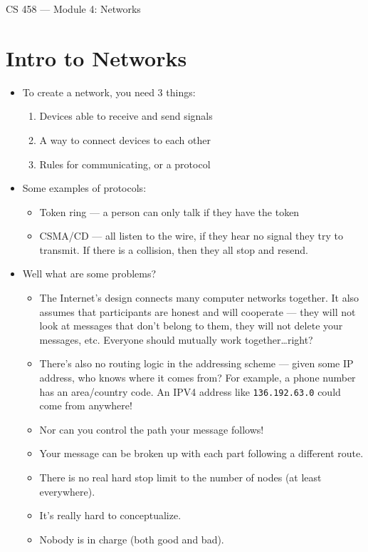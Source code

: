 \documentclass{article}
\author{Clement Tsang}
\begin{document}
\begin{center}
    \Large{CS 458 --- Module 4: Networks}
\end{center}

\section{Intro to Networks}
\begin{itemize}
    \item To create a network, you need 3 things:
        \begin{enumerate}
            \item Devices able to receive and send signals
            \item A way to connect devices to each other
            \item Rules for communicating, or a protocol
        \end{enumerate}
    \item Some examples of protocols:
        \begin{itemize}
            \item Token ring --- a person can only talk if they have the token
            \item CSMA/CD --- all listen to the wire, if they hear no signal they try to transmit.  If there is a collision, then they all stop and resend.
        \end{itemize}
    \item Well what are some problems?
        \begin{itemize}
            \item The Internet's design connects many computer networks together.  It also assumes that participants are honest and will cooperate --- they will not look at messages that don't belong to them, they will not delete your messages, etc.  Everyone should mutually work together\dots right?
            \item There's also no routing logic in the addressing scheme --- given some IP address, who knows where it comes from?  For example, a phone number has an area/country code.  An IPV4 address like \lstinline{136.192.63.0} could come from anywhere!
            \item Nor can you control the path your message follows!
            \item Your message can be broken up with each part following a different route.
            \item There is no real hard stop limit to the number of nodes (at least everywhere).
            \item It's really hard to conceptualize.
            \item Nobody is in charge (both good and bad).
        \end{itemize}
\end{itemize}
\end{document}
